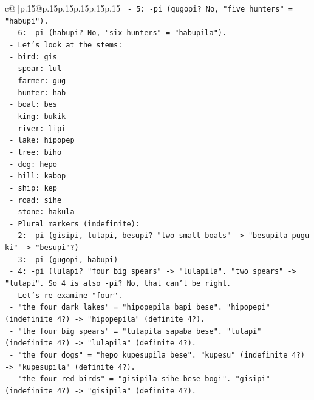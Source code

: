 \documentclass{article}
\begin{document}
{\begin{supertabular}{c@{$\;$}|p{.15\linewidth}@{}p{.15\linewidth}p{.15\linewidth}p{.15\linewidth}p{.15\linewidth}p{.15\linewidth}}
{{{\texttt{       {-} 5: {-}pi (gugopi? No, "five hunters" = "habupi").} \\
\texttt{       {-} 6: {-}pi (habupi? No, "six hunters" = "habupila").} \\
\texttt{     {-} Let's look at the stems:} \\
\texttt{       {-} bird: gis} \\
\texttt{       {-} spear: lul} \\
\texttt{       {-} farmer: gug} \\
\texttt{       {-} hunter: hab} \\
\texttt{       {-} boat: bes} \\
\texttt{       {-} king: bukik} \\
\texttt{       {-} river: lipi} \\
\texttt{       {-} lake: hipopep} \\
\texttt{       {-} tree: biho} \\
\texttt{       {-} dog: hepo} \\
\texttt{       {-} hill: kabop} \\
\texttt{       {-} ship: kep} \\
\texttt{       {-} road: sihe} \\
\texttt{       {-} stone: hakula} \\
\texttt{     {-} Plural markers (indefinite):} \\
\texttt{       {-} 2: {-}pi (gisipi, lulapi, besupi? "two small boats" {-}> "besupila pugu ki" {-}> "besupi"?)} \\
\texttt{       {-} 3: {-}pi (gugopi, habupi)} \\
\texttt{       {-} 4: {-}pi (lulapi? "four big spears" {-}> "lulapila". "two spears" {-}> "lulapi". So 4 is also {-}pi? No, that can't be right.} \\
\texttt{       {-} Let's re{-}examine "four".} \\
\texttt{       {-} "the four dark lakes" = "hipopepila bapi bese". "hipopepi" (indefinite 4?) {-}> "hipopepila" (definite 4?).} \\
\texttt{       {-} "the four big spears" = "lulapila sapaba bese". "lulapi" (indefinite 4?) {-}> "lulapila" (definite 4?).} \\
\texttt{       {-} "the four dogs" = "hepo kupesupila bese". "kupesu" (indefinite 4?) {-}> "kupesupila" (definite 4?).} \\
\texttt{       {-} "the four red birds" = "gisipila sihe bese bogi". "gisipi" (indefinite 4?) {-}> "gisipila" (definite 4?).} \\
}}}
\end{supertabular}}
\end{document}
